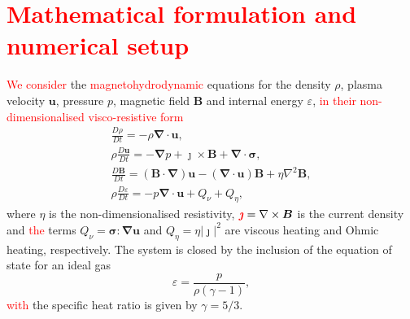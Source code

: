 \documentclass[12pt]{article}
\newcommand{\rs}[2]{\textcolor{red}{#2}}
\newcommand{\ten}[1]{{\bm #1}}
\renewcommand{\vec}[1]{{\bm #1}}
\begin{document}
\section{\rs{Numerical setup}{Mathematical formulation and numerical setup}}


\rs{Lare3d numerically solves}{We consider} the
\rs{MHD}{magnetohydrodynamic} equations for the density $\rho$, plasma
velocity $\vec{u}$, pressure $p$, magnetic field $\vec{B}$ and
internal energy $\varepsilon$, \rs{}{in their non-dimensionalised
  visco-resistive form}
\begin{subequations}
  \label{eq:MHD}
  \begin{gather}
\label{eq:mhda}
\frac{D\rho}{Dt} = - \rho \vec{\nabla} \cdot \vec{u},\\
\rho\frac{D\vec{u}}{Dt} = -\vec{\nabla} p + \vec{\jmath} \times \vec{B} + \vec{\nabla} \cdot \ten{\sigma},\\
\frac{D\vec{B}}{Dt} = (\vec{B} \cdot \vec{\nabla})\vec{u} - (\vec{\nabla} \cdot \vec{u})\vec{B} + \eta \nabla^2 \vec{B},\\
\rho\frac{D\varepsilon}{Dt} = -p \vec{\nabla} \cdot \vec{u} + {Q}_{\nu} + {Q}_{\eta},%
    \end{gather}
\end{subequations}
where $\eta$ is the non-dimensionalised resistivity,
$\rs{\jmath}{\vec{\jmath}} = \nabla \times \vec{B}$ is the current
density and \rs{$\ten{\sigma}$ is the viscous stress tensor (described
  below). The}{the} terms ${Q}_{\nu} = \ten{\sigma} : \vec{\nabla}\vec{u}$
  and ${Q}_{\eta} = \eta | \vec{\jmath} |^2$ are viscous heating and
  Ohmic heating, respectively. The system is closed by the inclusion
  of the equation of state for an ideal gas 
\begin{equation}
\varepsilon = \frac{p}{\rho(\gamma - 1)},
\end{equation}
\rs{where}{with} the specific heat ratio is given by $\gamma = 5/3$.
\end{document}
